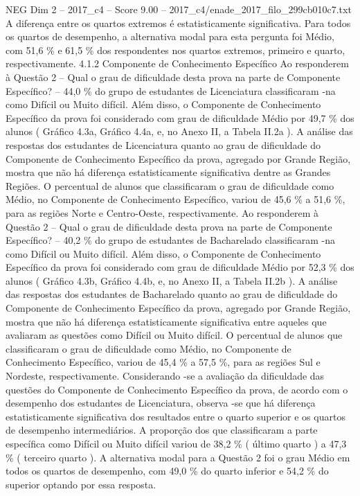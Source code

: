 \begin{textsample}{NEG Dim 2 – 2017\_c4 – Score 9.00 – 2017\_c4/enade\_2017\_filo\_299cb010c7.txt}
A diferença entre os quartos extremos é estatisticamente significativa.
Para todos os quartos de desempenho, a alternativa modal para esta pergunta foi Médio, com 51,6 \% e 61,5 \% dos respondentes nos quartos extremos, primeiro e quarto, respectivamente. 4.1.2 Componente de Conhecimento Específico Ao responderem à Questão 2 – Qual o grau de dificuldade desta prova na parte de Componente Específico? – 44,0 \% do grupo de estudantes de Licenciatura classificaram -na como Difícil ou Muito difícil.
Além disso, o Componente de Conhecimento Específico da prova foi considerado com grau de dificuldade Médio por 49,7 \% dos alunos ( Gráfico 4.3a, Gráfico 4.4a, e, no Anexo II, a Tabela II.2a ).
A análise das respostas dos estudantes de Licenciatura quanto ao grau de dificuldade do Componente de Conhecimento Específico da prova, agregado por Grande Região, mostra que não há diferença estatisticamente significativa dentre as Grandes Regiões.
O percentual de alunos que classificaram o grau de dificuldade como Médio, no Componente de Conhecimento Específico, variou de 45,6 \% a 51,6 \%, para as regiões Norte e Centro-Oeste, respectivamente.
Ao responderem à Questão 2 – Qual o grau de dificuldade desta prova na parte de Componente Específico? – 40,2 \% do grupo de estudantes de Bacharelado classificaram -na como Difícil ou Muito difícil.
Além disso, o Componente de Conhecimento Específico da prova foi considerado com grau de dificuldade Médio por 52,3 \% dos alunos ( Gráfico 4.3b, Gráfico 4.4b, e, no Anexo II, a Tabela II.2b ).
A análise das respostas dos estudantes de Bacharelado quanto ao grau de dificuldade do Componente de Conhecimento Específico da prova, agregado por Grande Região, mostra que não há diferença estatisticamente significativa entre aqueles que avaliaram as questões como Difícil ou Muito difícil.
O percentual de alunos que classificaram o grau de dificuldade como Médio, no Componente de Conhecimento Específico, variou de 45,4 \% a 57,5 \%, para as regiões Sul e Nordeste, respectivamente.
Considerando -se a avaliação da dificuldade das questões do Componente de Conhecimento Específico da prova, de acordo com o desempenho dos estudantes de Licenciatura, observa -se que há diferença estatisticamente significativa dos resultados entre o quarto superior e os quartos de desempenho intermediários.
A proporção dos que classificaram a parte específica como Difícil ou Muito difícil variou de 38,2 \% ( último quarto ) a 47,3 \% ( terceiro quarto ).
A alternativa modal para a Questão 2 foi o grau Médio em todos os quartos de desempenho, com 49,0 \% do quarto inferior e 54,2 \% do superior optando por essa resposta.

\end{textsample}
